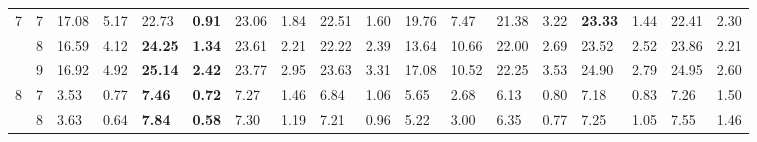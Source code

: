 \documentclass[conference]{IEEEtran}
\begin{document}
\begin{table}[]
\begin{tabular}{|cl|ll|ll|ll|ll|ll|ll|ll|ll|}
		\multicolumn{1}{|c|}{\multirow{3}{*}{7}}  & 7          & \multicolumn{1}{l|}{17.08}         & 5.17          & \multicolumn{1}{l|}{22.73}          & \textbf{0.91} & \multicolumn{1}{l|}{23.06}          & 1.84          & \multicolumn{1}{l|}{22.51}          & 1.60          & \multicolumn{1}{l|}{19.76}                & 7.47  & \multicolumn{1}{l|}{21.38} & 3.22 & \multicolumn{1}{l|}{\textbf{23.33}} & 1.44          & \multicolumn{1}{l|}{22.41}          & 2.30          \\ \cline{2-18} 
		\multicolumn{1}{|c|}{}                    & 8          & \multicolumn{1}{l|}{16.59}         & 4.12          & \multicolumn{1}{l|}{\textbf{24.25}} & \textbf{1.34} & \multicolumn{1}{l|}{23.61}          & 2.21          & \multicolumn{1}{l|}{22.22}          & 2.39          & \multicolumn{1}{l|}{13.64}                & 10.66 & \multicolumn{1}{l|}{22.00} & 2.69 & \multicolumn{1}{l|}{23.52}          & 2.52          & \multicolumn{1}{l|}{23.86}          & 2.21          \\ \cline{2-18} 
		\multicolumn{1}{|c|}{}                    & 9          & \multicolumn{1}{l|}{16.92}         & 4.92          & \multicolumn{1}{l|}{\textbf{25.14}} & \textbf{2.42} & \multicolumn{1}{l|}{23.77}          & 2.95          & \multicolumn{1}{l|}{23.63}          & 3.31          & \multicolumn{1}{l|}{17.08}                & 10.52 & \multicolumn{1}{l|}{22.25} & 3.53 & \multicolumn{1}{l|}{24.90}          & 2.79          & \multicolumn{1}{l|}{24.95}          & 2.60          \\ \hline
		\multicolumn{1}{|c|}{\multirow{3}{*}{8}}  & 7          & \multicolumn{1}{l|}{3.53}          & 0.77          & \multicolumn{1}{l|}{\textbf{7.46}}  & \textbf{0.72} & \multicolumn{1}{l|}{7.27}           & 1.46          & \multicolumn{1}{l|}{6.84}           & 1.06          & \multicolumn{1}{l|}{5.65}                 & 2.68  & \multicolumn{1}{l|}{6.13}  & 0.80 & \multicolumn{1}{l|}{7.18}           & 0.83          & \multicolumn{1}{l|}{7.26}           & 1.50          \\ \cline{2-18} 
		\multicolumn{1}{|c|}{}                    & 8          & \multicolumn{1}{l|}{3.63}          & 0.64          & \multicolumn{1}{l|}{\textbf{7.84}}  & \textbf{0.58} & \multicolumn{1}{l|}{7.30}           & 1.19          & \multicolumn{1}{l|}{7.21}           & 0.96          & \multicolumn{1}{l|}{5.22}                 & 3.00  & \multicolumn{1}{l|}{6.35}  & 0.77 & \multicolumn{1}{l|}{7.25}           & 1.05          & \multicolumn{1}{l|}{7.55}           & 1.46          \\ \cline{2-18} 

\end{tabular}
\end{table}
\end{document}
